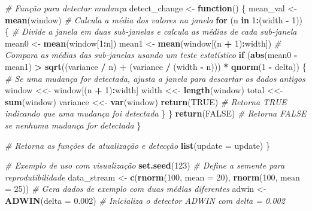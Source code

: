 \documentclass[
]{article}
\newenvironment{Shaded}{\begin{snugshade}}{\end{snugshade}}
\newcommand{\AttributeTok}[1]{\textcolor[rgb]{0.13,0.29,0.53}{#1}}
\newcommand{\CommentTok}[1]{\textcolor[rgb]{0.56,0.35,0.01}{\textit{#1}}}
\newcommand{\ConstantTok}[1]{\textcolor[rgb]{0.56,0.35,0.01}{#1}}
\newcommand{\ControlFlowTok}[1]{\textcolor[rgb]{0.13,0.29,0.53}{\textbf{#1}}}
\newcommand{\DecValTok}[1]{\textcolor[rgb]{0.00,0.00,0.81}{#1}}
\newcommand{\FloatTok}[1]{\textcolor[rgb]{0.00,0.00,0.81}{#1}}
\newcommand{\FunctionTok}[1]{\textcolor[rgb]{0.13,0.29,0.53}{\textbf{#1}}}
\newcommand{\NormalTok}[1]{#1}
\newcommand{\OtherTok}[1]{\textcolor[rgb]{0.56,0.35,0.01}{#1}}
\newcommand{\SpecialCharTok}[1]{\textcolor[rgb]{0.81,0.36,0.00}{\textbf{#1}}}
\begin{document}
\begin{Shaded}
\begin{Highlighting}[]
  \CommentTok{\# Função para detectar mudança}
\NormalTok{  detect\_change }\OtherTok{\textless{}{-}} \ControlFlowTok{function}\NormalTok{() \{}
\NormalTok{    mean\_val }\OtherTok{\textless{}{-}} \FunctionTok{mean}\NormalTok{(window) }\CommentTok{\# Calcula a média dos valores na janela}
    \ControlFlowTok{for}\NormalTok{ (n }\ControlFlowTok{in} \DecValTok{1}\SpecialCharTok{:}\NormalTok{(width }\SpecialCharTok{{-}} \DecValTok{1}\NormalTok{)) \{}
      \CommentTok{\# Divide a janela em duas sub{-}janelas e calcula as médias de cada sub{-}janela}
\NormalTok{      mean0 }\OtherTok{\textless{}{-}} \FunctionTok{mean}\NormalTok{(window[}\DecValTok{1}\SpecialCharTok{:}\NormalTok{n])}
\NormalTok{      mean1 }\OtherTok{\textless{}{-}} \FunctionTok{mean}\NormalTok{(window[(n }\SpecialCharTok{+} \DecValTok{1}\NormalTok{)}\SpecialCharTok{:}\NormalTok{width])}
      \CommentTok{\# Compara as médias das sub{-}janelas usando um teste estatístico}
      \ControlFlowTok{if}\NormalTok{ (}\FunctionTok{abs}\NormalTok{(mean0 }\SpecialCharTok{{-}}\NormalTok{ mean1) }\SpecialCharTok{\textgreater{}} \FunctionTok{sqrt}\NormalTok{((variance }\SpecialCharTok{/}\NormalTok{ n) }\SpecialCharTok{+}\NormalTok{ (variance }\SpecialCharTok{/}\NormalTok{ (width }\SpecialCharTok{{-}}\NormalTok{ n))) }\SpecialCharTok{*} \FunctionTok{qnorm}\NormalTok{(}\DecValTok{1} \SpecialCharTok{{-}}\NormalTok{ delta)) \{}
        \CommentTok{\# Se uma mudança for detectada, ajusta a janela para descartar os dados antigos}
\NormalTok{        window }\OtherTok{\textless{}\textless{}{-}}\NormalTok{ window[(n }\SpecialCharTok{+} \DecValTok{1}\NormalTok{)}\SpecialCharTok{:}\NormalTok{width]}
\NormalTok{        width }\OtherTok{\textless{}\textless{}{-}} \FunctionTok{length}\NormalTok{(window)}
\NormalTok{        total }\OtherTok{\textless{}\textless{}{-}} \FunctionTok{sum}\NormalTok{(window)}
\NormalTok{        variance }\OtherTok{\textless{}\textless{}{-}} \FunctionTok{var}\NormalTok{(window)}
        \FunctionTok{return}\NormalTok{(}\ConstantTok{TRUE}\NormalTok{) }\CommentTok{\# Retorna TRUE indicando que uma mudança foi detectada}
\NormalTok{      \}}
\NormalTok{    \}}
    \FunctionTok{return}\NormalTok{(}\ConstantTok{FALSE}\NormalTok{) }\CommentTok{\# Retorna FALSE se nenhuma mudança for detectada}
\NormalTok{  \}}
  
  \CommentTok{\# Retorna as funções de atualização e detecção}
  \FunctionTok{list}\NormalTok{(}\AttributeTok{update =}\NormalTok{ update)}
\NormalTok{\}}

\CommentTok{\# Exemplo de uso com visualização}
\FunctionTok{set.seed}\NormalTok{(}\DecValTok{123}\NormalTok{) }\CommentTok{\# Define a semente para reprodutibilidade}
\NormalTok{data\_stream }\OtherTok{\textless{}{-}} \FunctionTok{c}\NormalTok{(}\FunctionTok{rnorm}\NormalTok{(}\DecValTok{100}\NormalTok{, }\AttributeTok{mean =} \DecValTok{20}\NormalTok{), }\FunctionTok{rnorm}\NormalTok{(}\DecValTok{100}\NormalTok{, }\AttributeTok{mean =} \DecValTok{25}\NormalTok{)) }\CommentTok{\# Gera dados de exemplo com duas médias diferentes}
\NormalTok{adwin }\OtherTok{\textless{}{-}} \FunctionTok{ADWIN}\NormalTok{(}\AttributeTok{delta =} \FloatTok{0.002}\NormalTok{) }\CommentTok{\# Inicializa o detector ADWIN com delta = 0.002}


\end{Highlighting}
\end{Shaded}
\end{document}
